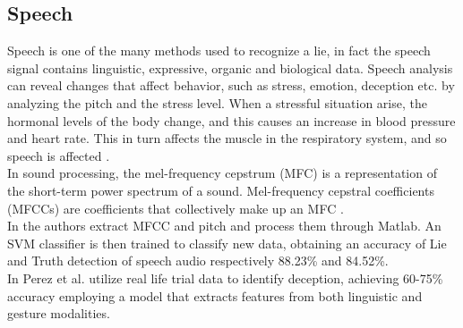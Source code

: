 \documentclass[LaM,binding=0.6cm,english,noexaminfo]{sapthesis}
\begin{document}
\subsection*{Speech}
Speech is one of the many methods used to recognize a lie, in fact the speech signal contains linguistic, expressive, organic and biological data. Speech analysis can reveal changes that affect behavior, such as stress, emotion, deception etc. by analyzing the pitch and the stress level. When a stressful situation arise, the hormonal levels of the body change, and this causes an increase in blood pressure and heart rate. This in turn affects the muscle in the respiratory system, and so speech is affected \cite{norena}. \\
In sound processing, the mel-frequency cepstrum (MFC) is a representation of the short-term power spectrum of a sound. Mel-frequency cepstral coefficients (MFCCs) are coefficients that collectively make up an MFC \cite{wiki:mfcc}. \\
In \cite{relidss} the authors extract MFCC and pitch and process them through Matlab. An SVM classifier is then trained to classify new data, obtaining an accuracy of Lie and Truth detection of speech audio respectively 88.23\% and 84.52\%. \\
In \cite{Perez-Rosas:2015:DDU:2818346.2820758} \cite{Mihalcea:2013:ADD:2522848.2522888} Perez et al. utilize real life trial data to identify deception, achieving 60-75\% accuracy employing a model that extracts features from both linguistic and gesture modalities.
 
\end{document}
